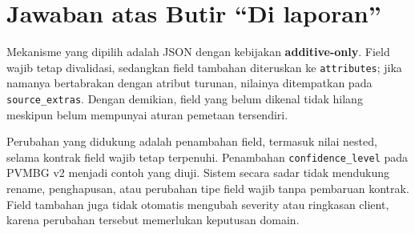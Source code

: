 \section{Jawaban atas Butir ``Di laporan''}
\label{sec:p1-di-laporan}
Mekanisme yang dipilih adalah JSON dengan kebijakan \textbf{additive-only}. Field wajib tetap divalidasi, sedangkan field tambahan diteruskan ke \texttt{attributes}; jika namanya bertabrakan dengan atribut turunan, nilainya ditempatkan pada \texttt{source\_extras}. Dengan demikian, field yang belum dikenal tidak hilang meskipun belum mempunyai aturan pemetaan tersendiri.

Perubahan yang didukung adalah penambahan field, termasuk nilai nested, selama kontrak field wajib tetap terpenuhi. Penambahan \texttt{confidence\_level} pada PVMBG v2 menjadi contoh yang diuji. Sistem secara sadar tidak mendukung rename, penghapusan, atau perubahan tipe field wajib tanpa pembaruan kontrak. Field tambahan juga tidak otomatis mengubah severity atau ringkasan client, karena perubahan tersebut memerlukan keputusan domain.
